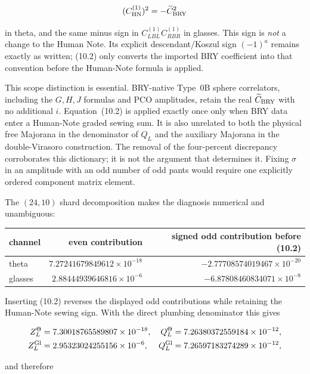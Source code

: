 \documentclass[11pt]{article}
\begin{document}
\[
 (C_{\rm HN}^{(1)})^2=-\widetilde C_{\rm BRY}^{2}
\]

in theta, and the same minus sign in
\(C^{(1)}_{LBL}C^{(1)}_{RBR}\) in glasses.  This sign is \emph{not} a change
to the Human Note.  Its explicit descendant/Koszul sign \((-1)^a\) remains
exactly as written; (10.2) only converts the imported BRY coefficient into
that convention before the Human-Note formula is applied.

This scope distinction is essential.  BRY-native Type~0B sphere correlators,
including the $G,H,J$ formulas and PCO amplitudes, retain the real
\(\widetilde C_{\rm BRY}\) with no additional $i$.  Equation~(10.2) is
applied exactly once only when BRY data enter a Human-Note graded sewing sum.
It is also unrelated to both the physical free Majorana in the denominator
of \(Q_L\) and the auxiliary Majorana in the double-Virasoro construction.
The removal of the four-percent discrepancy corroborates this dictionary;
it is not the argument that determines it.  Fixing \(\sigma\) in an amplitude
with an odd number of odd pants would require one explicitly ordered
component matrix element.

The \((24,10)\) shard decomposition makes the diagnosis numerical and
unambiguous:

\begin{center}
\small
\begin{tabular}{lrr}
\toprule
channel & even contribution & signed odd contribution before (10.2) \\
\midrule
theta & \(7.27241679849612\times10^{-18}\) & \(-2.77708574019467\times10^{-20}\) \\
glasses & \(2.88444939646816\times10^{-6}\) & \(-6.87808460834071\times10^{-8}\) \\
\bottomrule
\end{tabular}
\end{center}

Inserting (10.2) reverses the displayed odd contributions while retaining
the Human-Note sewing sign.  With the direct plumbing denominator this gives

\[
 \begin{aligned}
 Z_L^\Theta&=7.30018765589807\times10^{-18},&
 Q_L^\Theta&=7.26380372559184\times10^{-12},\\
 Z_L^{\rm Gl}&=2.95323024255156\times10^{-6},&
 Q_L^{\rm Gl}&=7.26597183274289\times10^{-12},
 \end{aligned}
\]

and therefore
\end{document}
